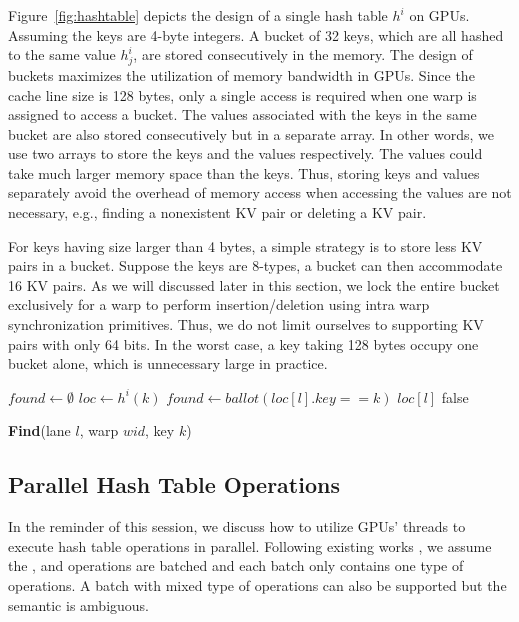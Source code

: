 Figure~\ref{fig:hashtable} depicts the design of a single hash table $h^i$ on GPUs. 
Assuming the keys are 4-byte integers. A bucket of 32 keys, which are all hashed to the same value $h^i_j$, are stored consecutively in the memory. 
The design of buckets maximizes the utilization of memory bandwidth in GPUs. 
Since the cache line size is 128 bytes, only a single access is required when one warp is assigned to access a bucket. 
The values associated with the keys in the same bucket are also stored consecutively but in a separate array.   
In other words, we use two arrays to store the keys and the values respectively.
The values could take much larger memory space than the keys. 
Thus, storing keys and values separately avoid the overhead of memory access when accessing the values are not necessary, 
e.g., finding a nonexistent KV pair or deleting a KV pair. 

For keys having size larger than 4 bytes, a simple strategy is to store less KV pairs in a bucket. Suppose the keys are 8-types, a bucket can then accommodate 16 KV pairs. 
As we will discussed later in this section, we lock the entire bucket exclusively for a warp to perform insertion/deletion using intra warp synchronization primitives. Thus, we do not limit ourselves to supporting KV pairs with only 64 bits. 
In the worst case, a key taking 128 bytes occupy one bucket alone, which is unnecessary large in practice.


\begin{algorithm}[t]
	\begin{algorithmic}[1]
		\State $found \gets \emptyset$
		\State $loc \gets h^i(k)$
		\State $found \gets ballot(loc[l].key == k)$
		\State \Return $loc[l]$
		\EndIf
		\EndFor
		\State \Return false
	\end{algorithmic}
	\caption{\textbf{Find}(lane $l$, warp $wid$, key $k$)}\label{algo:find}
\end{algorithm}

\subsection{Parallel Hash Table Operations}\label{sec:vot:con}
In the reminder of this session, we discuss how to utilize GPUs' threads to execute hash table operations in parallel.
Following existing works \cite{alcantara2009real,zhang2015mega,breslow2016horton}, we assume the ,  and  operations are batched and each batch only contains one type of operations. A batch with mixed type of operations can also be supported but the semantic is ambiguous. 



